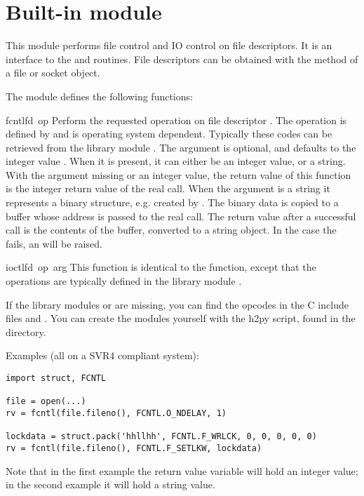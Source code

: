 \section{Built-in module }

This module performs file control and IO control on file descriptors.
It is an interface to the  and  \UNIX routines.
File descriptors can be obtained with the  method of a
file or socket object.

The module defines the following functions:

\renewcommand{\indexsubitem}{(in module struct)}

\begin{funcdesc}{fcntl}{fd\, op}
  Perform the requested operation on file descriptor .
  The operation is defined by  and is operating system
  dependent.  Typically these codes can be retrieved from the library
  module . The argument  is optional, and
  defaults to the integer value .  When
  it is present, it can either be an integer value, or a string.  With
  the argument missing or an integer value, the return value of this
  function is the integer return value of the real 
  call.  When the argument is a string it represents a binary
  structure, e.g.  created by . The binary data is
  copied to a buffer whose address is passed to the real 
  call.  The return value after a successful call is the contents of
  the buffer, converted to a string object.  In the case the
   fails, an  will be raised.
\end{funcdesc}

\begin{funcdesc}{ioctl}{fd\, op\, arg}
  This function is identical to the  function, except
  that the operations are typically defined in the library module
  .
\end{funcdesc}

If the library modules  or  are missing, you
can find the opcodes in the C include files  and
. You can create the modules yourself with the h2py
script, found in the  directory.

Examples (all on a SVR4 compliant system):

\bcode\begin{verbatim}
import struct, FCNTL

file = open(...)
rv = fcntl(file.fileno(), FCNTL.O_NDELAY, 1)

lockdata = struct.pack('hhllhh', FCNTL.F_WRLCK, 0, 0, 0, 0, 0)
rv = fcntl(file.fileno(), FCNTL.F_SETLKW, lockdata)
\end{verbatim}\ecode

Note that in the first example the return value variable  will
hold an integer value; in the second example it will hold a string
value.
